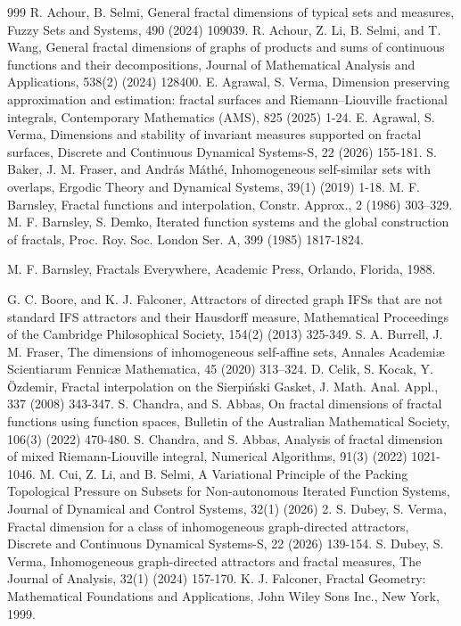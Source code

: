 \documentclass[12pt,oneside,reqno]{amsart}
\theoremstyle{definition}
\theoremstyle{remark}
\begin{document}
\begin{thebibliography}{999}
 R. Achour, B. Selmi, General fractal dimensions of typical sets and measures, Fuzzy Sets and Systems, 490 (2024) 109039.
 R. Achour, Z. Li, B. Selmi, and T. Wang, General fractal dimensions of graphs of products and sums of continuous functions and their decompositions, Journal of Mathematical Analysis and Applications, 538(2) (2024) 128400.
 E. Agrawal, S. Verma, Dimension preserving approximation and estimation: fractal surfaces and Riemann–Liouville fractional integrals, Contemporary Mathematics (AMS), 825 (2025) 1-24.
 E. Agrawal, S. Verma, Dimensions and stability of invariant measures supported on fractal surfaces,
Discrete and Continuous Dynamical Systems-S, 22 (2026) 155-181.
 S. Baker, J. M. Fraser, and Andr\'{a}s M\'{a}th\'{e}, Inhomogeneous self-similar sets with overlaps, Ergodic Theory and Dynamical Systems, 39(1)
(2019) 1-18.
 M. F. Barnsley, Fractal functions and interpolation, Constr. Approx., 2 (1986) 303–329.
 M. F. Barnsley, S. Demko, Iterated function systems and the global construction of fractals, Proc. Roy. Soc. London Ser. A, 399 (1985) 1817-1824.

 M. F. Barnsley, Fractals Everywhere, Academic Press, Orlando, Florida, 1988.

 G. C. Boore, and K. J. Falconer, Attractors of directed graph IFSs that are not standard IFS attractors and their Hausdorff measure, Mathematical Proceedings of the Cambridge Philosophical Society, 154(2) (2013) 325-349.
 S. A. Burrell, J. M. Fraser, The dimensions of inhomogeneous self-affine sets, Annales Academiæ Scientiarum Fennicæ Mathematica, 45 (2020) 313–324.
 D. Celik, S. Kocak, Y. \"Ozdemir, Fractal interpolation on the Sierpi\'nski Gasket, J. Math. Anal. Appl., 337 (2008) 343-347.
 S. Chandra, and S. Abbas, On fractal dimensions of fractal functions using function spaces, Bulletin of the Australian Mathematical Society, 106(3) (2022) 470-480.
 S. Chandra, and S. Abbas, Analysis of fractal dimension of mixed Riemann-Liouville integral, Numerical Algorithms, 91(3) (2022) 1021-1046.
 M. Cui, Z. Li, and B. Selmi, A Variational Principle of the Packing Topological Pressure on Subsets for Non-autonomous Iterated Function Systems, Journal of Dynamical and Control Systems, 32(1) (2026) 2.
 S. Dubey, S. Verma, Fractal dimension for a class of inhomogeneous graph-directed attractors, Discrete and Continuous Dynamical Systems-S, 22 (2026) 139-154. 
 S. Dubey, S. Verma, Inhomogeneous graph-directed attractors and fractal measures, The Journal of Analysis, 32(1) (2024) 157-170.
 K. J. Falconer, Fractal Geometry: Mathematical Foundations and Applications, John Wiley Sons Inc., New York, 1999.


\end{thebibliography}
\end{document}
